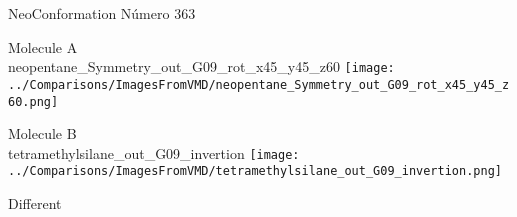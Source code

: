 \vtab[-3cm]
\begin{center}
{\large NeoConformation \tab Número 363}
\end{center}
\begin{multicols}{2}
\begin{center}
Molecule A \\ 
neopentane\_Symmetry\_out\_G09\_rot\_x45\_y45\_z60
\texttt{[image: ../Comparisons/ImagesFromVMD/neopentane\_Symmetry\_out\_G09\_rot\_x45\_y45\_z60.png]}
\\
\vtab

\columnbreak
Molecule B \\ 
tetramethylsilane\_out\_G09\_invertion
\texttt{[image: ../Comparisons/ImagesFromVMD/tetramethylsilane\_out\_G09\_invertion.png]}
\\
\vtab


\end{center}
\end{multicols}
\begin{center}
\textcolor{NavyBlue}{\Large Different}
\end{center}

 \newpage

